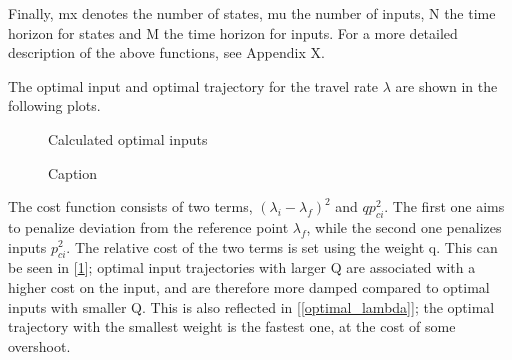 Finally, mx denotes the number of states, mu the number of inputs, N the time horizon for states and M the time horizon for inputs. For a more detailed description of the above functions, see Appendix X.

The optimal input and optimal trajectory for the travel rate $\lambda$ are shown in the following plots.

\begin{figure}[h]
    \centering
    \caption{Calculated optimal inputs}
    \label{fig:optimal_inputs}
\end{figure}

\begin{figure}[H]
    \centering
    \caption{Caption}
    \label{fig:optimal_lambda}
\end{figure}

The cost function  consists of two terms, $(\lambda_i - \lambda_f)^2$ and $qp_{ci}^2$. The first one aims to penalize deviation from the reference point $\lambda_f$, while the second one penalizes inputs $p_{ci}^2$. The relative cost of the two terms is set using the weight q. This can be seen in [\ref{fig:optimal_inputs}]; optimal input trajectories with larger Q are associated with a higher cost on the input, and are therefore more damped compared to optimal inputs with smaller Q. This is also reflected in [\ref{optimal_lambda}]; the optimal trajectory with the smallest weight is the fastest one, at the cost of some overshoot.

